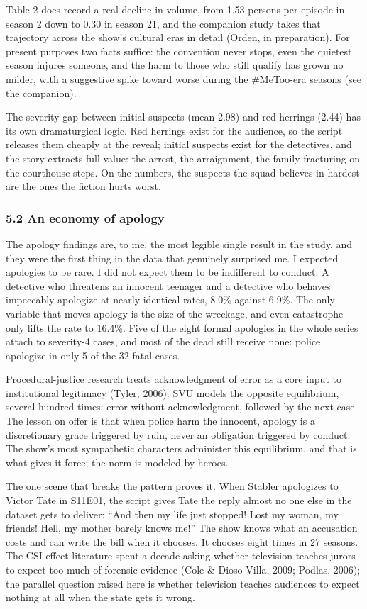 \documentclass[
]{article}
\newcounter{none} %
\begin{document}
Table 2 does record a real decline in volume, from 1.53 persons per
episode in season 2 down to 0.30 in season 21, and the companion study
takes that trajectory across the show's cultural eras in detail (Orden,
in preparation). For present purposes two facts suffice: the convention
never stops, even the quietest season injures someone, and the harm to
those who still qualify has grown no milder, with a suggestive spike
toward worse during the \#MeToo-era seasons (see the companion).

The severity gap between initial suspects (mean 2.98) and red herrings
(2.44) has its own dramaturgical logic. Red herrings exist for the
audience, so the script releases them cheaply at the reveal; initial
suspects exist for the detectives, and the story extracts full value:
the arrest, the arraignment, the family fracturing on the courthouse
steps. On the numbers, the suspects the squad believes in hardest are
the ones the fiction hurts worst.

\subsubsection{5.2 An economy of apology}\label{an-economy-of-apology}

The apology findings are, to me, the most legible single result in the
study, and they were the first thing in the data that genuinely
surprised me. I expected apologies to be rare. I did not expect them to
be indifferent to conduct. A detective who threatens an innocent
teenager and a detective who behaves impeccably apologize at nearly
identical rates, 8.0\% against 6.9\%. The only variable that moves
apology is the size of the wreckage, and even catastrophe only lifts the
rate to 16.4\%. Five of the eight formal apologies in the whole series
attach to severity-4 cases, and most of the dead still receive none:
police apologize in only 5 of the 32 fatal cases.

Procedural-justice research treats acknowledgment of error as a core
input to institutional legitimacy (Tyler, 2006). SVU models the opposite
equilibrium, several hundred times: error without acknowledgment,
followed by the next case. The lesson on offer is that when police harm
the innocent, apology is a discretionary grace triggered by ruin, never
an obligation triggered by conduct. The show's most sympathetic
characters administer this equilibrium, and that is what gives it force;
the norm is modeled by heroes.

The one scene that breaks the pattern proves it. When Stabler apologizes
to Victor Tate in S11E01, the script gives Tate the reply almost no one
else in the dataset gets to deliver: ``And then my life just stopped!
Lost my woman, my friends! Hell, my mother barely knows me!'' The show
knows what an accusation costs and can write the bill when it chooses.
It chooses eight times in 27 seasons. The CSI-effect literature spent a
decade asking whether television teaches jurors to expect too much of
forensic evidence (Cole \& Dioso-Villa, 2009; Podlas, 2006); the
parallel question raised here is whether television teaches audiences to
expect nothing at all when the state gets it wrong.
\end{document}
